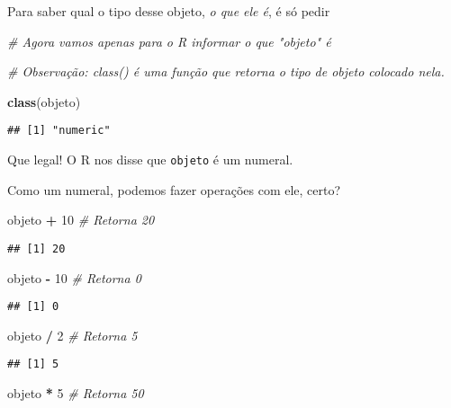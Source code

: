 \documentclass[
]{article}
\newenvironment{Shaded}{\begin{snugshade}}{\end{snugshade}}
\newcommand{\CommentTok}[1]{\textcolor[rgb]{0.56,0.35,0.01}{\textit{#1}}}
\newcommand{\DecValTok}[1]{\textcolor[rgb]{0.00,0.00,0.81}{#1}}
\newcommand{\KeywordTok}[1]{\textcolor[rgb]{0.13,0.29,0.53}{\textbf{#1}}}
\newcommand{\NormalTok}[1]{#1}
\newcommand{\OperatorTok}[1]{\textcolor[rgb]{0.81,0.36,0.00}{\textbf{#1}}}
\newcommand{\StringTok}[1]{\textcolor[rgb]{0.31,0.60,0.02}{#1}}
\begin{document}
Para saber qual o tipo desse objeto, \emph{o que ele é}, é só pedir

\begin{Shaded}
\begin{Highlighting}[]
\CommentTok{# Agora vamos apenas para o R informar o que "objeto" é}

\CommentTok{# Observação: class() é uma função que retorna o tipo de objeto colocado nela.}

\KeywordTok{class}\NormalTok{(objeto)}
\end{Highlighting}
\end{Shaded}

\begin{verbatim}
## [1] "numeric"
\end{verbatim}

Que legal! O R nos disse que \texttt{objeto} é um numeral.

Como um numeral, podemos fazer operações com ele, certo?

\begin{Shaded}
\begin{Highlighting}[]
\NormalTok{objeto }\OperatorTok{+}\StringTok{ }\DecValTok{10}  \CommentTok{# Retorna 20}
\end{Highlighting}
\end{Shaded}

\begin{verbatim}
## [1] 20
\end{verbatim}

\begin{Shaded}
\begin{Highlighting}[]
\NormalTok{objeto }\OperatorTok{-}\StringTok{ }\DecValTok{10}  \CommentTok{# Retorna 0}
\end{Highlighting}
\end{Shaded}

\begin{verbatim}
## [1] 0
\end{verbatim}

\begin{Shaded}
\begin{Highlighting}[]
\NormalTok{objeto }\OperatorTok{/}\StringTok{ }\DecValTok{2}   \CommentTok{# Retorna 5}
\end{Highlighting}
\end{Shaded}

\begin{verbatim}
## [1] 5
\end{verbatim}

\begin{Shaded}
\begin{Highlighting}[]
\NormalTok{objeto }\OperatorTok{*}\StringTok{ }\DecValTok{5}   \CommentTok{# Retorna 50}
\end{Highlighting}
\end{Shaded}
\end{document}
